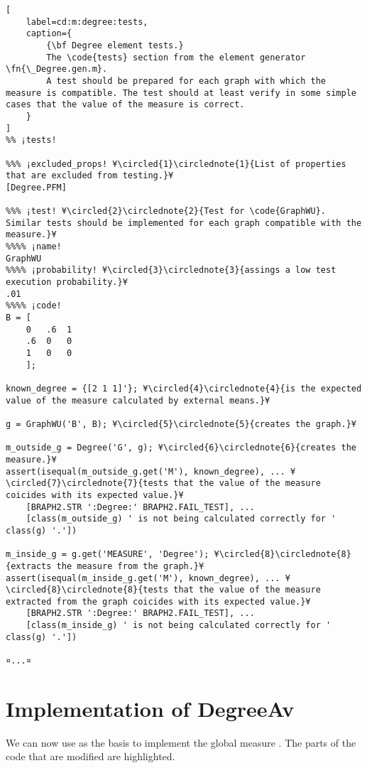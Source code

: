 \documentclass{tufte-handout}
\begin{document}
\begin{lstlisting}[
	label=cd:m:degree:tests,
	caption={
		{\bf Degree element tests.}
		The \code{tests} section from the element generator \fn{\_Degree.gen.m}.
		A test should be prepared for each graph with which the measure is compatible. The test should at least verify in some simple cases that the value of the measure is correct.
	}
]
%% ¡tests!

%%% ¡excluded_props! ¥\circled{1}\circlednote{1}{List of properties that are excluded from testing.}¥
[Degree.PFM] 

%%% ¡test! ¥\circled{2}\circlednote{2}{Test for \code{GraphWU}. Similar tests should be implemented for each graph compatible with the measure.}¥
%%%% ¡name!
GraphWU
%%%% ¡probability! ¥\circled{3}\circlednote{3}{assings a low test execution probability.}¥
.01
%%%% ¡code!
B = [
    0   .6  1
    .6  0   0
    1   0   0
    ];

known_degree = {[2 1 1]'}; ¥\circled{4}\circlednote{4}{is the expected value of the measure calculated by external means.}¥

g = GraphWU('B', B); ¥\circled{5}\circlednote{5}{creates the graph.}¥

m_outside_g = Degree('G', g); ¥\circled{6}\circlednote{6}{creates the measure.}¥
assert(isequal(m_outside_g.get('M'), known_degree), ... ¥\circled{7}\circlednote{7}{tests that the value of the measure coicides with its expected value.}¥ 
    [BRAPH2.STR ':Degree:' BRAPH2.FAIL_TEST], ...
    [class(m_outside_g) ' is not being calculated correctly for ' class(g) '.'])

m_inside_g = g.get('MEASURE', 'Degree'); ¥\circled{8}\circlednote{8}{extracts the measure from the graph.}¥
assert(isequal(m_inside_g.get('M'), known_degree), ... ¥\circled{8}\circlednote{8}{tests that the value of the measure extracted from the graph coicides with its expected value.}¥
    [BRAPH2.STR ':Degree:' BRAPH2.FAIL_TEST], ...
    [class(m_inside_g) ' is not being calculated correctly for ' class(g) '.'])

¤...¤
\end{lstlisting}

\clearpage
\section{Implementation of DegreeAv}

We can now use  as the basis to implement the global measure .
The parts of the code that are modified are highlighted.
\end{document}
